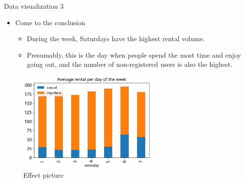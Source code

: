 \documentclass[
  size=14pt,
  paper=smartboard,  %
  mode=present, 		%
  display=slides, 	%
  style=tuliplab,  	%
  pauseslide,
  fleqn,leqno]{powerdot}
\begin{document}
\begin{slide}[toc=,bm=]{Data visualization 3}
\begin{itemize}
\item
Come to the conclusion

\begin{itemize}
\item
\smallskip
During the week, Saturdays have the highest rental volume.
\item
\smallskip
Presumably, this is the day when people spend the most time and enjoy going out, and the number of non-registered users is also the highest.
\end{itemize}
\end{itemize}
\vspace{-2.5em}
\begin{figure}[htb]
  \centering
  \includegraphics[width=0.62\textwidth]{figures//week-count.eps}
  \vspace{-1.4em}
  \caption{Effect picture}
\end{figure}

\end{slide}





\end{document}
